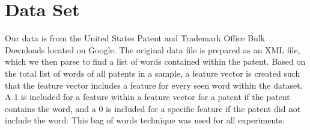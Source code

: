 \section{Data Set}
\cite*{mimno-mccallum-11}
Our data is from the United States Patent and Trademark Office Bulk Downloads located on Google.  The original data file is prepared as an XML file, which we then parse to find a list of words contained within the patent.  Based on the total list of words of all patents in a sample, a feature vector is created such that the feature vector includes a feature for every seen word within the dataset.  A 1 is included for a feature within a feature vector for a patent if the patent contains the word, and a 0 is included for a specific feature if the patent did not include the word.  This bag of words technique was used for all experiments.